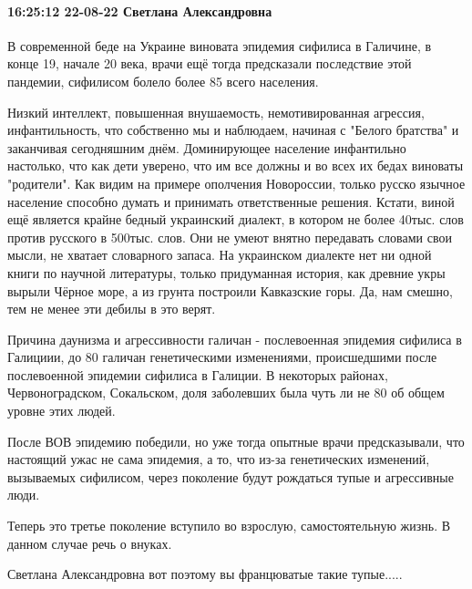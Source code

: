  
 
 
 
 

\paragraph{16:25:12 22-08-22 Светлана Александровна}

В современной беде на Украине виновата
эпидемия сифилиса в Галичине, в конце 19, начале 20 века, врачи ещё
тогда предсказали последствие этой пандемии, сифилисом болело более 85%
всего населения.

Низкий интеллект, повышенная внушаемость,
немотивированная агрессия, инфантильность, что собственно мы и
наблюдаем, начиная с "Белого братства" и заканчивая сегодняшним днём.
Доминирующее население инфантильно настолько, что как дети уверено, что
им все должны и во всех их бедах виноваты "родители". Как видим на
примере ополчения Новороссии, только русско язычное население способно
думать и принимать ответственные решения. Кстати, виной ещё является
крайне бедный украинский диалект, в котором не более 40тыс. слов против
русского в 500тыс. слов. Они не умеют внятно передавать словами свои
мысли, не хватает словарного запаса. На украинском диалекте нет ни одной
книги по научной литературы, только придуманная история, как древние
укры вырыли Чёрное море, а из грунта построили Кавказские горы. Да, нам
смешно, тем не менее эти дебилы в это верят.

Причина даунизма и
агрессивности галичан - послевоенная эпидемия сифилиса в Галициии, до
80%
галичан генетическими изменениями, происшедшими после послевоенной
эпидемии сифилиса в Галиции. В некоторых районах, Червоноградском,
Сокальском, доля заболевших была чуть ли не 80%
об общем уровне этих людей.

После ВОВ эпидемию победили, но уже
тогда опытные врачи предсказывали, что настоящий ужас не сама эпидемия, а
то, что из-за генетических изменений, вызываемых сифилисом, через
поколение будут рождаться тупые и агрессивные люди.

Теперь это третье поколение вступило во взрослую, самостоятельную жизнь. В данном случае речь о внуках.

Светлана Александровна
вот поэтому вы францюватые такие тупые.....
